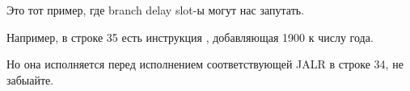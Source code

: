 


Это тот пример, где branch delay slot-ы могут нас запутать.

Например, в строке 35 есть инструкция , добавляющая 1900 к числу года.

Но она исполняется перед исполнением соответствующей JALR в строке 34, не забыайте.

